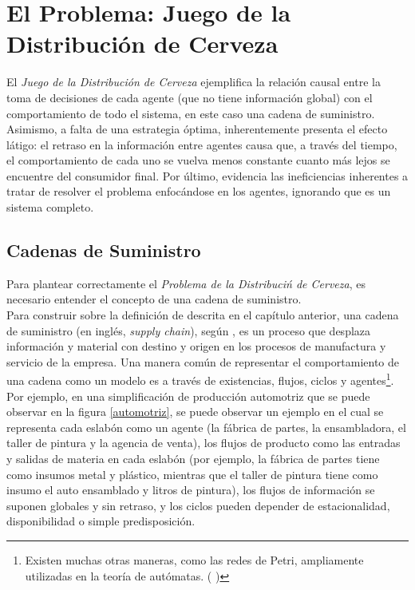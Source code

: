 \chapter{El Problema: Juego de la Distribuci\'on de Cerveza}

El \textit{Juego de la Distribución de Cerveza} ejemplifica la relaci\'on causal entre la toma de decisiones de cada agente (que no tiene informaci\'on global) con el comportamiento de todo el sistema, en este caso una cadena de suministro. Asimismo, a falta de una estrategia \'optima, inherentemente presenta el efecto l\'atigo: el retraso en la informaci\'on entre agentes causa que, a trav\'es del tiempo, el comportamiento de cada uno se vuelva menos constante cuanto m\'as lejos se encuentre del consumidor final. Por \'ultimo, evidencia las ineficiencias inherentes a tratar de resolver el problema enfoc\'andose en los agentes, ignorando que es un sistema completo. 




\section{Cadenas de Suministro}

Para plantear correctamente el \textit{Problema de la Distribuci\'n de Cerveza}, es necesario entender el concepto de una cadena de suministro. \\

Para construir sobre la definici\'on de \citet{Sterman} descrita en el cap\'itulo anterior, una cadena de suministro (en ingl\'es, \textit{supply chain}), seg\'un \citet{Jacobs}, es un proceso que desplaza informaci\'on y material con destino y origen en los procesos de manufactura y servicio de la empresa. Una manera com\'un de representar el comportamiento de una cadena como un modelo es a trav\'es de existencias, flujos, ciclos y agentes\footnote{Existen muchas otras maneras, como las redes de Petri, ampliamente utilizadas en la teor\'ia de aut\'omatas. ( \citet{Shiflet})}. Por ejemplo, en una simplificaci\'on de producci\'on automotriz que se puede observar en la figura \ref{automotriz}, se puede observar un ejemplo en el cual se representa cada eslab\'on como un agente (la f\'abrica de partes, la ensambladora, el taller de pintura y la agencia de venta), los flujos de producto como las entradas y salidas de materia en cada eslab\'on (por ejemplo, la f\'abrica de partes tiene como insumos metal y pl\'astico, mientras que el taller de pintura tiene como insumo el auto ensamblado y litros de pintura), los flujos de informaci\'on se suponen globales y sin retraso, y los ciclos pueden depender de estacionalidad, disponibilidad o simple predisposici\'on.\\

